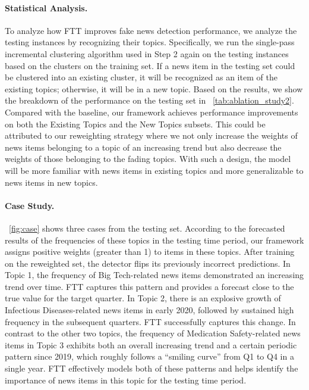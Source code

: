 \documentclass[11pt]{article}
\begin{document}
\paragraph{Statistical Analysis.} To analyze how FTT improves fake news detection performance, we analyze the testing instances by recognizing their topics. Specifically, we run the single-pass incremental clustering algorithm used in Step 2 again on the testing instances based on the clusters on the training set. If a news item in the testing set could be clustered into an existing cluster, it will be recognized as an item of the existing topics; otherwise, it will be in a new topic.
Based on the results, we show the breakdown of the performance on the testing set in \tablename~\ref{tab:ablation_study2}. Compared with the baseline, our framework achieves performance improvements on both the Existing Topics and the New Topics subsets. This could be attributed to our reweighting strategy where we not only increase the weights of news items belonging to a topic of an increasing trend but also decrease the weights of those belonging to the fading topics. With such a design, the model will be more familiar with news items in existing topics and more generalizable to news items in new topics.

\paragraph{Case Study.}
\figurename~\ref{fig:case} shows three cases from the testing set. According to the forecasted results of the frequencies of these topics in the testing time period, our framework assigns positive weights (greater than 1) to items in these topics. After training on the reweighted set, the detector flips its previously incorrect predictions. In Topic 1, the frequency of Big Tech-related news items demonstrated an increasing trend over time. FTT captures this pattern and provides a forecast close to the true value for the target quarter. In Topic 2, there is an explosive growth of Infectious Diseases-related news items in early 2020, followed by sustained high frequency in the subsequent quarters. FTT successfully captures this change. In contrast to the other two topics, the frequency of Medication Safety-related news items in Topic 3 exhibits both an overall increasing trend and a certain periodic pattern since 2019, which roughly follows a ``smiling curve'' from Q1 to Q4 in a single year. FTT effectively models both of these patterns and helps identify the importance of news items in this topic for the testing time period.
\end{document}
